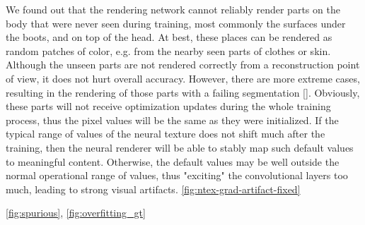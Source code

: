 We found out that the rendering network cannot reliably render parts on the body that were never seen during training, most commonly the surfaces under the boots, and on top of the head. At best, these places can be rendered as random patches of color, e.g. from the nearby seen parts of clothes or skin. Although the unseen parts are not rendered correctly from a reconstruction point of view, it does not hurt overall accuracy. However, there are more extreme cases, resulting in the rendering of those parts with a failing segmentation \ref{}. Obviously, these parts will not receive optimization updates during the whole training process, thus the pixel values will be the same as they were initialized. If the typical range of values of the neural texture does not shift much after the training, then the neural renderer will be able to stably map such default values to meaningful content. Otherwise, the default values may be well outside the normal operational range of values, thus "exciting" the convolutional layers too much, leading to strong visual artifacts.
\ref{fig:ntex-grad-artifact-fixed}

\ref{fig:spurious}, \ref{fig:overfitting_gt}



